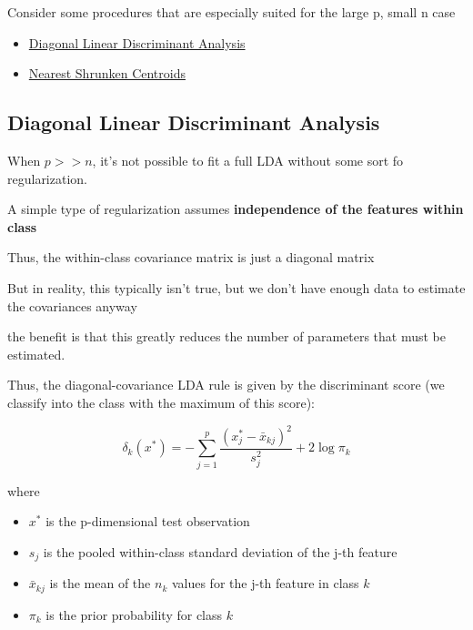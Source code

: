 \documentclass[
]{book}
\providecommand{\tightlist}{%
  \setlength{\itemsep}{0pt}\setlength{\parskip}{0pt}}
\begin{document}
Consider some procedures that are especially suited for the large p, small n case

\begin{itemize}
\item
  \protect\hyperlink{diagonal-linear-discriminant-analysis}{Diagonal Linear Discriminant Analysis}
\item
  \protect\hyperlink{nearest-shrunken-centroids}{Nearest Shrunken Centroids}
\end{itemize}

\hypertarget{diagonal-linear-discriminant-analysis}{%
\subsection{Diagonal Linear Discriminant Analysis}\label{diagonal-linear-discriminant-analysis}}

When \(p >> n\), it's not possible to fit a full LDA without some sort fo regularization.

A simple type of regularization assumes \textbf{independence of the features within class}

Thus, the within-class covariance matrix is just a diagonal matrix

But in reality, this typically isn't true, but we don't have enough data to estimate the covariances anyway

the benefit is that this greatly reduces the number of parameters that must be estimated.

Thus, the diagonal-covariance LDA rule is given by the discriminant score (we classify into the class with the maximum of this score):

\[
\delta_k(x^*) = - \sum_{j=1}^p \frac{(x_j^* - \bar{x}_{kj})^2}{s_j^2} + 2 \log \pi_k
\]

where

\begin{itemize}
\tightlist
\item
  \(x^*\) is the p-dimensional test observation
\end{itemize}

\begin{itemize}
\item
  \(s_j\) is the pooled within-class standard deviation of the j-th feature
\item
  \(\bar{x}_{kj}\) is the mean of the \(n_k\) values for the j-th feature in class \(k\)
\item
  \(\pi_k\) is the prior probability for class \(k\)
\end{itemize}
\end{document}
